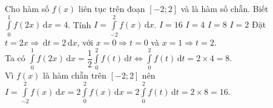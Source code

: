 \begin{ex}%
	Cho hàm số $f(x)$ liên tục trên đoạn $\left[-2;2\right]$ và là hàm số chẵn. Biết $\displaystyle\int\limits_0^1 f(2x)\mathrm{\,d}x=4$. Tính $I=\displaystyle\int\limits_{-2}^2 f(x)\mathrm{\,d}x$.
	\choice
	{\True $I=16$}
	{$I=4$}
	{$I=8$}
	{$I=2$}
	\loigiai
	{
		Đặt $t=2x \Rightarrow \mathrm{\,d}t=2 \mathrm{\,d}x$, với $x=0\Rightarrow t=0$ và $x=1\Rightarrow t=2$.\\
		Ta có $\displaystyle\int\limits_0^1 f(2x)\mathrm{\,d}x=\dfrac{1}{2}\displaystyle\int\limits_0^2 f(t)\mathrm{\,d}t \Leftrightarrow \displaystyle\int\limits_0^2 f(t)\mathrm{\,d}t=2\times4=8$.\\
		Vì $f(x)$ là hàm chẵn trên $\left[-2;2\right]$ nên $I=\displaystyle\int\limits_{-2}^2 f(x)\mathrm{\,d}x =2\displaystyle\int\limits_{0}^2 f(x)\mathrm{\,d}x=2\displaystyle\int\limits_{0}^2 f(t)\mathrm{\,d}t=2\times8=16.$
	}
\end{ex}

